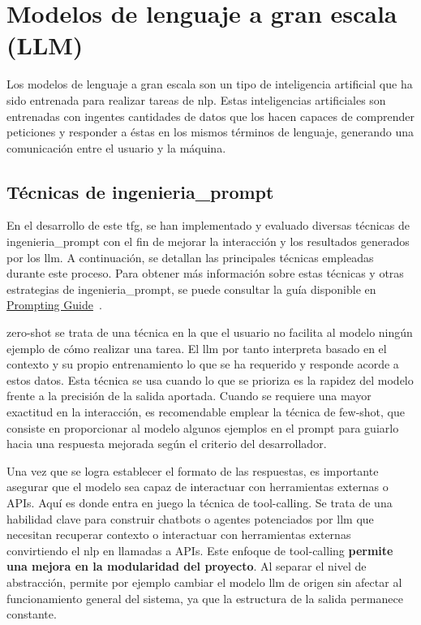 \section{Modelos de lenguaje a gran escala (LLM)}
Los modelos de lenguaje a gran escala son un tipo de inteligencia artificial que ha sido entrenada para realizar tareas de \acrfull{nlp}. Estas inteligencias artificiales son entrenadas con ingentes cantidades de datos que los hacen capaces de comprender peticiones y responder a éstas en los mismos términos de lenguaje, generando una comunicación entre el usuario y la máquina.
	
	\subsection{Técnicas de \gls{ingenieria_prompt}}
	En el desarrollo de este \acrshort{tfg}, se han implementado y evaluado diversas técnicas de \gls{ingenieria_prompt} con el fin de mejorar la interacción y los resultados generados por los \acrshort{llm}. A continuación, se detallan las principales técnicas empleadas durante este proceso. Para obtener más información sobre estas técnicas y otras estrategias de \gls{ingenieria_prompt}, se puede consultar la guía disponible en \href{https://www.promptingguide.ai/es}{Prompting Guide}~\cite{promptingguide}.
	
	\gls{zero-shot} se trata de una técnica en la que el usuario no facilita al modelo ningún ejemplo de cómo realizar una tarea. El \acrshort{llm} por tanto interpreta basado en el contexto y su propio entrenamiento lo que se ha requerido y responde acorde a estos datos. Esta técnica se usa cuando lo que se prioriza es la rapidez del modelo frente a la precisión de la salida aportada. Cuando se requiere una mayor exactitud en la interacción, es recomendable emplear la técnica de \gls{few-shot}, que consiste en proporcionar al modelo algunos ejemplos en el prompt para guiarlo hacia una respuesta mejorada según el criterio del desarrollador.
	
	Una vez que se logra establecer el formato de las respuestas, es importante asegurar que el modelo sea capaz de interactuar con herramientas externas o APIs. Aquí es donde entra en juego la técnica de \gls{tool-calling}.
	Se trata de una habilidad clave para construir chatbots o agentes potenciados por \acrshort{llm} que necesitan recuperar contexto o interactuar con herramientas externas convirtiendo el \acrlong{nlp} en llamadas a APIs.
	Este enfoque de \gls{tool-calling} \textbf{permite una mejora en la modularidad del proyecto}. Al separar el nivel de abstracción, permite por ejemplo cambiar el modelo \acrshort{llm} de origen sin afectar al funcionamiento general del sistema, ya que la estructura de la salida permanece constante.

